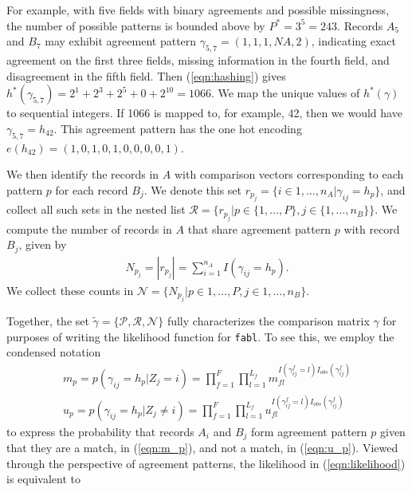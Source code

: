 \documentclass[ba]{imsart}
\begin{document}
For example, with five fields with binary agreements and possible missingness, the number of possible patterns is bounded above by $P^{*} = 3^5 = 243$. Records $A_5$ and $B_7$ may exhibit agreement pattern $\gamma_{5,7} = (1, 1, 1, NA, 2)$, indicating exact agreement on the first three fields, missing information in the fourth field, and disagreement in the fifth field. Then (\ref{eqn:hashing}) gives $h^{*}(\gamma_{5,7}) = 2^1 + 2^3 + 2^5 + 0 + 2^{10} = 1066$. We map the unique values of $h^{*}(\gamma)$ to sequential integers. If 1066 is mapped to, for example, 42, then we would have $\gamma_{5,7} = h_{42}.$ This agreement pattern has the one hot encoding $e(h_{42}) = (1, 0, 1, 0, 1, 0, 0, 0, 0, 1)$.

We then identify the records in $A$ with comparison vectors corresponding to each pattern $p$ for each record $B_j$. We denote this set $r_{p_j} = \{i \in 1, \dots, n_A | \gamma_{ij} = h_p\}$, and collect all such sets in the nested list $\mathcal{R} = \{r_{p_j} | p \in \{1, \ldots, P\}, j \in \{1, \ldots, n_B\} \}$. We compute the number of records in $A$ that share agreement pattern $p$ with record $B_j$, given by
\begin{align}\label{eqn:N}
N_{p_j} = |r_{p_j}| = \sum_{i=1}^{n_A} I(\gamma_{ij} = h_p).
\end{align}
We collect these counts in $\mathcal{N} = \{N_{p_j} |p \in 1, \ldots, P, j \in 1, \ldots, n_B \}$. 

Together, the set $\tilde{\gamma} = \{\mathcal{P}, \mathcal{R}, \mathcal{N}\}$ fully characterizes the comparison matrix $\gamma$ for purposes of writing the likelihood function for \texttt{fabl}. To see this, we employ the condensed notation
\begin{subequations}
	\begin{align}
		m_p =  p(\gamma_{ij} = h_p|Z_j = i) = \prod_{f=1}^{F}\prod_{l=1}^{L_f} m_{fl}^{I(\gamma_{ij}^f = l)I_{obs}(\gamma_{ij}^f)}\label{eqn:m_p} \\
		u_p =  p(\gamma_{ij} = h_p|Z_j \neq i) = \prod_{f=1}^{F}\prod_{l=1}^{L_f} u_{fl}^{I(\gamma_{ij}^f = l)I_{obs}(\gamma_{ij}^f)}\label{eqn:u_p}
	\end{align}
\end{subequations}
to express the probability that records $A_i$ and $B_j$ form agreement pattern $p$ given that they are a match, in (\ref{eqn:m_p}), and not a match, in (\ref{eqn:u_p}). Viewed through the perspective of agreement patterns, the likelihood in (\ref{eqn:likelihood}) is equivalent to
\end{document}
